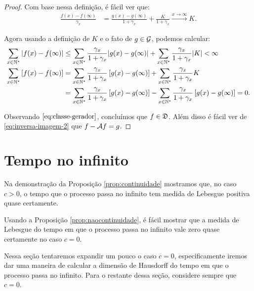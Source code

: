 \begin{proof}
  Com base nessa definição, é fácil ver que:
  \begin{align}
    \label{eq:inversa-imagem-2}
    \frac{f(x) - f(\infty)}{\gamma_x} &=
    \frac{g(x) - g(\infty) }{1+\gamma_x} +
    \frac{K}{1+\gamma_x} \xrightarrow{x \to \infty} K.
  \end{align}

  Agora usando a definição de $K$ e o fato de $g \in {\mathcal{G}}$, podemos calcular:
  \begin{align*}
    \sum_{x \in {\mathbb{N^*}}} \left|f(x) - f(\infty)\right|
    &\leq \sum_{x\in{\mathbb{N^*}}} \frac{\gamma_x}{1+\gamma_x} |g(x) -
    g(\infty)|
    + \sum_{x\in{\mathbb{N^*}}} \frac{\gamma_x}{1+\gamma_x} |K| < \infty\\
    \sum_{x \in {\mathbb{N^*}}} \left[f(x) - f(\infty)\right]
    &= \sum_{x\in{\mathbb{N^*}}} \frac{\gamma_x}{1+\gamma_x} \left[g(x) -
    g(\infty)\right]
    + \sum_{x\in{\mathbb{N^*}}} \frac{\gamma_x}{1+\gamma_x} K\\
    &= \sum_{x\in{\mathbb{N^*}}} \frac{\gamma_x}{1+\gamma_x} \left[g(x) -
    g(\infty)\right]
  - \sum_{x\in{\mathbb{N^*}}} \frac{\gamma_x}{1+\gamma_x} \left[g(x) -
    g(\infty)\right] = 0.
  \end{align*}

  Observando $\eqref{eq:classe-gerador}$, concluímos que $f \in
  {\mathfrak{D}}$. Além disso é fácil ver de \eqref{eq:inversa-imagem-2} que $f
  - {\mathcal{A}} f = g$.
\end{proof}




\section{Tempo no infinito}
\label{sec:tempo-infinito}

Na demonstração da Proposição \ref{prop:continuidade} mostramos que,
no caso $c > 0$, o tempo que o processo passa no infinito tem medida
de Lebesgue positiva quase certamente.

Usando a Proposição \ref{prop:naocontinuidade}, é fácil mostrar que a
medida de Lebesgue do tempo em que o processo passa no infinito vale
zero quase certamente no caso $c = 0$.

Nessa seção tentaremos expandir um pouco o caso $c = 0$,
especificamente iremos dar uma maneira de calcular a dimensão de
Hausdorff do tempo em que o processo passa no infinito.  Para o
restante dessa seção, considere sempre que $c = 0$.

